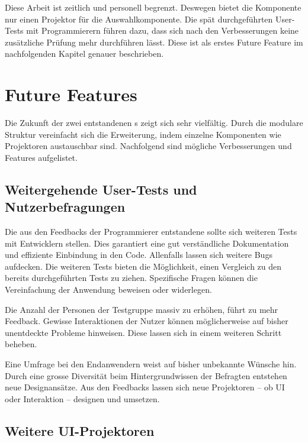 Diese Arbeit ist zeitlich und personell begrenzt. 
Deswegen bietet die Komponente nur einen Projektor für die Auswahlkomponente. 
Die spät durchgeführten User-Tests mit Programmierern führen dazu, dass sich nach den Verbesserungen keine zusätzliche Prüfung mehr durchführen lässt. 
Diese ist als erstes Future Feature im nachfolgenden Kapitel genauer beschrieben. 


\section{Future Features}
\label{sec:future}

Die Zukunft der zwei entstandenen s zeigt sich sehr vielfältig. 
Durch die modulare Struktur vereinfacht sich die Erweiterung, indem einzelne Komponenten wie Projektoren austauschbar sind. 
Nachfolgend sind mögliche Verbesserungen und Features aufgelistet. 

\clearpage
\subsection{Weitergehende User-Tests und Nutzerbefragungen}
\label{sec:moreUserTests}

Die aus den Feedbacks der Programmierer entstandene  sollte sich weiteren Tests mit Entwicklern stellen. 
Dies garantiert eine gut verständliche Dokumentation und effiziente Einbindung in den Code. 
Allenfalls lassen sich weitere Bugs aufdecken. 
Die weiteren Tests bieten die Möglichkeit, einen Vergleich zu den bereits durchgeführten Tests zu ziehen. 
Spezifische Fragen können die Vereinfachung der Anwendung beweisen oder widerlegen. 

Die Anzahl der Personen der Testgruppe massiv zu erhöhen, führt zu mehr Feedback. 
Gewisse Interaktionen der Nutzer können möglicherweise auf bisher unentdeckte Probleme hinweisen. 
Diese lassen sich in einem weiteren Schritt beheben. 

Eine Umfrage bei den Endanwendern weist auf bisher unbekannte Wünsche hin. 
Durch eine grosse Diversität beim Hintergrundwissen der Befragten entstehen neue Designansätze. 
Aus den Feedbacks lassen sich neue Projektoren – ob UI oder Interaktion – designen und umsetzen. 


\subsection{Weitere UI-Projektoren}
\label{sec:moreUi}

